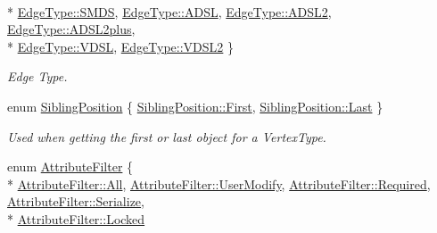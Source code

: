 \begin{DoxyCompactItemize}
\\*
\hyperlink{namespace_n_m_1_1_o_d_b_a1ac3948936d4d0ab4367d35aa46068daab512600a0f150f5bdf9934d515aea5dd}{Edge\+Type\+::\+S\+M\+D\+S}, 
\hyperlink{namespace_n_m_1_1_o_d_b_a1ac3948936d4d0ab4367d35aa46068daaed50e8c7eb72b1e8cd4f89af085a7c2a}{Edge\+Type\+::\+A\+D\+S\+L}, 
\hyperlink{namespace_n_m_1_1_o_d_b_a1ac3948936d4d0ab4367d35aa46068daa56255bb2915ceb9e94fee2d2a750e61c}{Edge\+Type\+::\+A\+D\+S\+L2}, 
\hyperlink{namespace_n_m_1_1_o_d_b_a1ac3948936d4d0ab4367d35aa46068daaef80bb8b076492a60807ff9ca10bee42}{Edge\+Type\+::\+A\+D\+S\+L2plus}, 
\\*
\hyperlink{namespace_n_m_1_1_o_d_b_a1ac3948936d4d0ab4367d35aa46068daaa230ed6cdd0a223ddca6246ddfd9da79}{Edge\+Type\+::\+V\+D\+S\+L}, 
\hyperlink{namespace_n_m_1_1_o_d_b_a1ac3948936d4d0ab4367d35aa46068daa859d19d4cb0c9d5a26bcc86f4c8aad61}{Edge\+Type\+::\+V\+D\+S\+L2}
 \}\begin{DoxyCompactList}\small\item\em Edge Type. \end{DoxyCompactList}
\item 
enum \hyperlink{namespace_n_m_1_1_o_d_b_a1b474aa7e937112cda42381969dcb55e}{Sibling\+Position} \{ \hyperlink{namespace_n_m_1_1_o_d_b_a1b474aa7e937112cda42381969dcb55ea7fb55ed0b7a30342ba6da306428cae04}{Sibling\+Position\+::\+First}, 
\hyperlink{namespace_n_m_1_1_o_d_b_a1b474aa7e937112cda42381969dcb55ead55b30607c2a9a2616347d6edb789f6b}{Sibling\+Position\+::\+Last}
 \}\begin{DoxyCompactList}\small\item\em Used when getting the first or last object for a Vertex\+Type. \end{DoxyCompactList}
\item 
enum \hyperlink{namespace_n_m_1_1_o_d_b_a3c1c138c7d11b589aaa8863b6a8c1317}{Attribute\+Filter} \{ \\*
\hyperlink{namespace_n_m_1_1_o_d_b_a3c1c138c7d11b589aaa8863b6a8c1317ab1c94ca2fbc3e78fc30069c8d0f01680}{Attribute\+Filter\+::\+All}, 
\hyperlink{namespace_n_m_1_1_o_d_b_a3c1c138c7d11b589aaa8863b6a8c1317ac5c2ba169fe9f4c9dd1a57a274b5f2c2}{Attribute\+Filter\+::\+User\+Modify}, 
\hyperlink{namespace_n_m_1_1_o_d_b_a3c1c138c7d11b589aaa8863b6a8c1317ab651efdb98a5d6bd2b3935d0c3f4a5e2}{Attribute\+Filter\+::\+Required}, 
\hyperlink{namespace_n_m_1_1_o_d_b_a3c1c138c7d11b589aaa8863b6a8c1317a32a7aaf47c67e07f529ea3feea00dec9}{Attribute\+Filter\+::\+Serialize}, 
\\*
\hyperlink{namespace_n_m_1_1_o_d_b_a3c1c138c7d11b589aaa8863b6a8c1317ad0f2e5376298c880665077b565ffd7dd}{Attribute\+Filter\+::\+Locked}

\end{DoxyCompactItemize}

